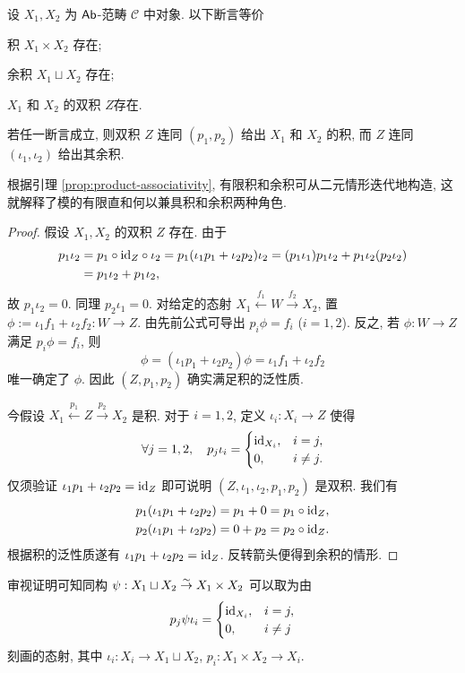 \begin{theorem}\label{prop:biproduct-criterion}
	设 $X_1, X_2$ 为 $\mathsf{Ab}$-范畴 $\mathcal{C}$ 中对象. 以下断言等价
	\begin{compactenum}[(i)]
		\item 积 $X _1\times X_2$ 存在;
		\item 余积 $X_1 \sqcup X_2$ 存在;
		\item $X_1$ 和 $X_2$ 的双积 $Z$存在.
	\end{compactenum}
	若任一断言成立, 则双积 $Z$ 连同 $(p_1, p_2)$ 给出 $X_1$ 和 $X_2$ 的积, 而 $Z$ 连同 $(\iota_1, \iota_2)$ 给出其余积.
\end{theorem}
根据引理 \ref{prop:product-associativity}, 有限积和余积可从二元情形迭代地构造, 这就解释了模的有限直和何以兼具积和余积两种角色.
\begin{proof}
	假设 $X_1, X_2$ 的双积 $Z$ 存在. 由于
	\begin{align*}
		p_1 \iota_2 & = p_1 \circ \mathrm{id}_Z \circ \iota_2 =  p_1 (\iota_1 p_1 + \iota_2 p_2) \iota_2 = (p_1 \iota_1) p_1 \iota_2 + p_1 \iota_2 (p_2 \iota_2)  \\
		& = p_1 \iota_2 + p_1 \iota_2,
	\end{align*}
	故 $p_1 \iota_2 = 0$. 同理 $p_2 \iota_1 = 0$. 对给定的态射 $X_1 \xleftarrow{f_1} W \xrightarrow{f_2} X_2$, 置 $\phi := \iota_1 f_1 + \iota_2 f_2 : W \to Z$. 由先前公式可导出 $p_i \phi = f_i$ ($i=1,2$). 反之, 若 $\phi: W \to Z$ 满足 $p_i \phi = f_i$, 则
	\[ \phi = (\iota_1 p_1 + \iota_2 p_2) \phi = \iota_1 f_1 + \iota_2 f_2 \]
	唯一确定了 $\phi$. 因此 $(Z, p_1, p_2)$ 确实满足积的泛性质.

	今假设 $X_1 \xleftarrow{p_1} Z \xrightarrow{p_2} X_2$ 是积. 对于 $i=1,2$, 定义 $\iota_i: X_i \to Z$ 使得
	\[ \forall j=1,2, \quad  p_j \iota_i =
		\begin{cases}
			\mathrm{id}_{X_i}, & i=j, \\
			0, & i \neq j .
		\end{cases}
	\]
	仅须验证 $\iota_1 p_1 + \iota_2 p_2 = \mathrm{id}_Z$ 即可说明 $(Z, \iota_1, \iota_2, p_1, p_2)$ 是双积. 我们有
	\begin{align*}
		p_1 (\iota_1 p_1 + \iota_2 p_2) & = p_1 + 0 = p_1 \circ \mathrm{id}_Z , \\
		p_2 (\iota_1 p_1 + \iota_2 p_2) & = 0 + p_2 = p_2 \circ \mathrm{id}_Z.
	\end{align*}
	根据积的泛性质遂有 $\iota_1 p_1 + \iota_2 p_2 = \mathrm{id}_Z$. 反转箭头便得到余积的情形.
\end{proof}
\begin{remark}
	审视证明可知同构 $\psi: X_1 \sqcup X_2 \stackrel{\sim}{\rightarrow} X_1 \times X_2$ 可以取为由
	\[ p_j \psi \iota_i =
		\begin{cases}
			\mathrm{id}_{X_i}, & i=j, \\
			0, & i \neq j
		\end{cases} \]
	刻画的态射, 其中 $\iota_i : X_i \to X_1 \sqcup X_2$, $p_i: X_1 \times X_2 \to X_i$.
\end{remark}

